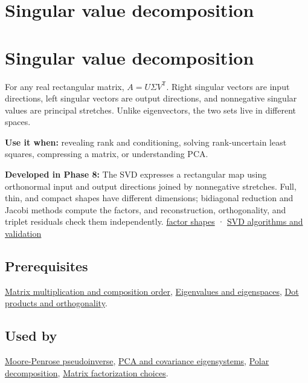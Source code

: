 \hypertarget{appendix-1fad5e7f36fa}{}
\section*{Singular value decomposition}
\section{Singular value decomposition}\label{singular-value-decomposition}

For any real rectangular matrix, \(A=U\Sigma V^\mathsf T\). Right singular vectors are input directions, left singular vectors are output directions, and nonnegative singular values are principal stretches. Unlike eigenvectors, the two sets live in different spaces.

\textbf{Use it when:} revealing rank and conditioning, solving rank-uncertain least squares, compressing a matrix, or understanding PCA.

\textbf{Developed in Phase 8:} The SVD expresses a rectangular map using orthonormal input and output directions joined by nonnegative stretches. Full, thin, and compact shapes have different dimensions; bidiagonal reduction and Jacobi methods compute the factors, and reconstruction, orthogonality, and triplet residuals check them independently. \href{Continuous\%20Notes/Computing\%20Foundations\%20-\%20From\%20Bits\%20to\%20C++\%20and\%20Systems\%20APIs\#Full,\%20thin,\%20and\%20compact\%20shapes\%20for\%20tall\%20and\%20wide\%20matrices}{factor shapes} · \href{Continuous\%20Notes/Computing\%20Foundations\%20-\%20From\%20Bits\%20to\%20C++\%20and\%20Systems\%20APIs\#How\%20numerical\%20software\%20computes\%20and\%20checks\%20an\%20SVD}{SVD algorithms and validation}

\subsection{Prerequisites}\label{prerequisites}

\hyperref[appendix-ab31ef447dbf]{Matrix multiplication and composition order}, \hyperref[appendix-0b3be18411f9]{Eigenvalues and eigenspaces}, \hyperref[appendix-8bc4e8fc547c]{Dot products and orthogonality}.

\subsection{Used by}\label{used-by}

\hyperref[appendix-541306fdbc1b]{Moore-Penrose pseudoinverse}, \hyperref[appendix-ad175ef3c5bf]{PCA and covariance eigensystems}, \hyperref[appendix-73f5bcf7a462]{Polar decomposition}, \hyperref[appendix-221a483bec2d]{Matrix factorization choices}.

